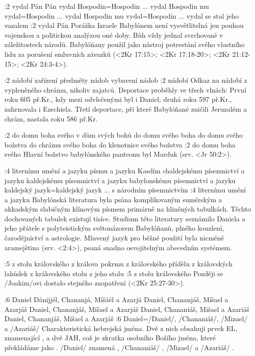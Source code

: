 :2  
    {vydal Pán}  %
    {Pán vydal} %
    {Hospodin}={Hospodin ... vydal}  %
    {Hospodin mu vydal}={Hospodin ... vydal} %
    {Hospodin mu vydal}={Hospodin ... vydal}  %
    {se stal jeho vazalem}  %
:2 {vydal Pán} Porážka Izraele Babylónem není vysvětlitelná jen pouhou vojenskou a politickou analýzou oné doby. Bůh vždy jednal svrchovaně v záležitostech národů. Babylóňany použil jako nástroj potrestání svého vlastního lidu za porušení smluvních závazků (<2Kr 17:15>; <2Kr 17:18-20>; <2Kr 21:12-15>; <2Kr 24:3-4>).

:2
    {nádobí}  %
    {zařízení} %
    {předměty}  %
    {nádob} %
    {vybavení}  %
    {nádob}  %
:2 {nádobí} Odkaz na nádobí z vypleněného chrámu, nikoliv zajatců. Deportace proběhly ve třech vlnách: První roku 605 př.Kr., kdy mezi odvlečenými byl i Daniel; druhá roku 597 př.Kr., zahrnovala i Ezechiela. Třetí deportace, při které Babylóňané zničili Jeruzalém a chrám, nastala roku 586 př.Kr.

:2 
    {do domu boha svého}  %
     {v dům svých bohů} %
    {do domu svého boha}  %
    {do domu svého božstva} %
    {do chrámu svého boha}  %
    {do klenotnice svého božstva}  %
:2 {do domu boha svého}  Hlavní božstvo babylónského panteonu byl Marduk  (srv. <Jr 50:2>).

:4
    {liternímu umění a jazyku}  %
    {písmu a jazyku Kasdím} %
    {chaldejskému písemnictví a jazyku}  %
    {kaldejskému písemnictví a jazyku} %
    {babylonskému písemnictví a jazyku}  %
    {kaldejský jazyk}={kaldejský jazyk ... s národním písemnictvím}  %
:4 {liternímu umění a jazyku} Babylónská literatura byla psána komplikovaným sumérským a akkadským slabičným klínovým písmem primárně na hliněných tabulkách. Těchto dochovaných tabulek existují tisíce. Studium této literatury seznámilo Daniela a jeho přátele s polyteistickým světonázorem Babylóňanů, plného kouzlení, čarodějnictví a astrologie.  Mluvený jazyk pro běžné použití byla nicméně aramejština (srv. <2:4>), psaná snadno osvojitelným abecedním systémem.

:5
    {z stolu královského}  %
    {z králova pokrmu} %
    {z královského přídělu}  %
    {z královských lahůdek} %
    {z královského stolu}  %
    {z jeho stolu} %
:5 {z stolu královského} Později se \x/Joakim/ovi dostalo stejného zaopatření (<2Kr 25:27-30>).

:6
    {Daniel}  %
    {Dánijjél, Chananjá, Míšáél a Azarjá} %
    {Daniel, Chananjáš, Míšael a Azarjáš}  %
    {Daniel, Chananjáš, Míšael a Azarjáš} %
    {Daniel, Chananiáš, Mišael a Azariáš}  %
    {Daniel, Chananjáš, Míšael a Azarjáš}  %
:6 {Daniel}={\x/Daniel/, \x/Chananiáš/, \x/Mizael/ a \x/Azariáš/} Charakteristická  hebrejská jména. Dvě z nich obsahují prvek EL, znamenající , a dvě JAH, což je zkratka osobního Božího jména, které překládáme jako .  \x/Daniel/ znamená , \x/Chananiáš/ , \x/Mizael/  a \x/Azariáš/ .

